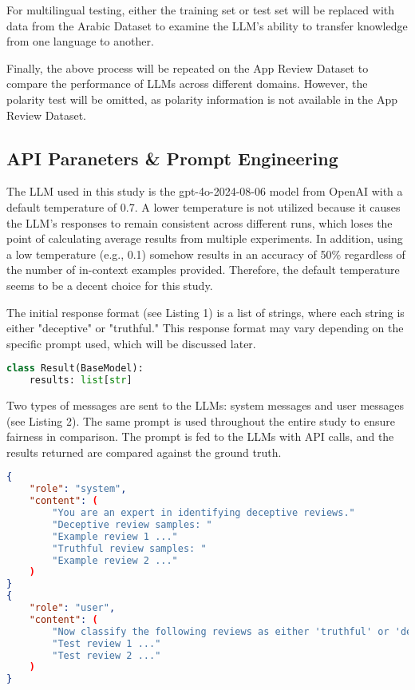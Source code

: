 \documentclass[sigconf, nonacm]{acmart}
\theoremstyle{definition}
\begin{document}
For multilingual testing, either the training set or test set will be replaced with data from the Arabic Dataset to examine the LLM's ability to transfer knowledge from one language to another.

Finally, the above process will be repeated on the App Review Dataset to compare the performance of LLMs across different domains. However, the polarity test will be omitted, as polarity information is not available in the App Review Dataset.

\subsection{API Paraneters \& Prompt Engineering}

The LLM used in this study is the gpt-4o-2024-08-06 model from OpenAI with a default temperature of 0.7. A lower temperature is not utilized because it causes the LLM's responses to remain consistent across different runs, which loses the point of calculating average results from multiple experiments. In addition, using a low temperature (e.g., 0.1) somehow results in an accuracy of 50\% regardless of the number of in-context examples provided. Therefore, the default temperature seems to be a decent choice for this study.

The initial response format (see Listing 1) is a list of strings, where each string is either "deceptive" or "truthful." This response format may vary depending on the specific prompt used, which will be discussed later.

\begin{lstlisting}[language=Python, caption={Initial Response Format}]
class Result(BaseModel):
    results: list[str]
\end{lstlisting}

Two types of messages are sent to the LLMs: system messages and user messages (see Listing 2). The same prompt is used throughout the entire study to ensure fairness in comparison. The prompt is fed to the LLMs with API calls, and the results returned are compared against the ground truth.

\begin{lstlisting}[language=json, caption={Initial Prompt Messages}]
{
    "role": "system",
    "content": (
        "You are an expert in identifying deceptive reviews."
        "Deceptive review samples: "
        "Example review 1 ..."
        "Truthful review samples: "
        "Example review 2 ..."
    )
}
{
    "role": "user",
    "content": (
        "Now classify the following reviews as either 'truthful' or 'deceptive': "
        "Test review 1 ..."
        "Test review 2 ..."
    )
}
\end{lstlisting}
\end{document}
